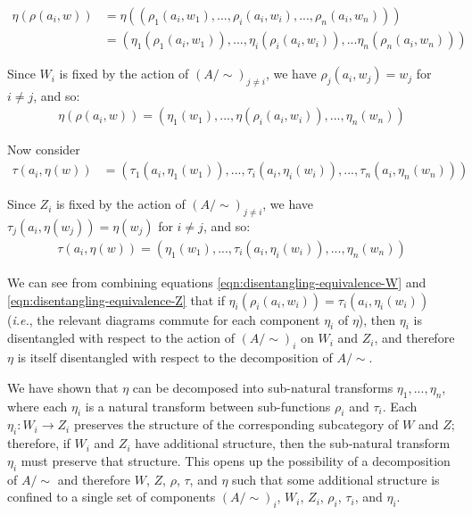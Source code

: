 \begin{align*}
    \eta(\rho(a_{i}, w)) &= \eta((\rho_{1}(a_{i}, w_{1}),..., \rho_{i}(a_{i}, w_{i}), ..., \rho_{n}(a_{i}, w_{n}))) \\
    &= (\eta_{1}(\rho_{1}(a_{i}, w_{1})), ..., \eta_{i}(\rho_{i}(a_{i}, w_{i})), ... \eta_{n}(\rho_{n}(a_{i}, w_{n})))
\end{align*}

Since $W_{i}$ is fixed by the action of $(A/\sim)_{j \neq i}$, we have $\rho_{j}(a_{i}, w_{j}) = w_{j}$ for $i \neq j$, and so:
\begin{align}
    \eta(\rho(a_{i}, w)) = (\eta_{1}(w_{1}), ..., \eta(\rho_{i}(a_{i}, w_{i})), ..., \eta_{n}(w_{n}))
    \label{eqn:disentangling-equivalence-W}
\end{align}

Now consider
\begin{align*}
    \tau(a_{i}, \eta(w)) &= (\tau_{1}(a_{i}, \eta_{1}(w_{1})),..., \tau_{i}(a_{i}, \eta_{i}(w_{i})), ..., \tau_{n}(a_{i}, \eta_{n}(w_{n})))
\end{align*}

Since $Z_{i}$ is fixed by the action of $(A/\sim)_{j \neq i}$, we have $\tau_{j}(a_{i}, \eta(w_{j})) = \eta(w_{j})$ for $i \neq j$, and so:
\begin{align}
    \tau(a_{i}, \eta(w)) = (\eta_{1}(w_{1}),..., \tau_{i}(a_{i}, \eta_{i}(w_{i})), ..., \eta_{n}(w_{n}))
    \label{eqn:disentangling-equivalence-Z}
\end{align}

We can see from combining equations \ref{eqn:disentangling-equivalence-W} and \ref{eqn:disentangling-equivalence-Z} that if $\eta_{i}(\rho_{i}(a_{i}, w_{i})) = \tau_{i}(a_{i}, \eta_{i}(w_{i}))$ (\textit{i.e.}, the relevant diagrams commute for each component $\eta_{i}$ of $\eta$), then $\eta_{i}$ is disentangled with respect to the action of $(A/\sim)_{i}$ on $W_{i}$ and $Z_{i}$, and therefore $\eta$ is itself disentangled with respect to the decomposition of $A/\sim$.

We have shown that $\eta$ can be decomposed into sub-natural transforms $\eta_{1}, ..., \eta_{n}$, where each $\eta_{i}$ is a natural transform between sub-functions $\rho_{i}$ and $\tau_{i}$.
Each $\eta_{i}: W_{i} \to Z_{i}$ preserves the structure of the corresponding subcategory of $W$ and $Z$; therefore, if $W_{i}$ and $Z_{i}$ have additional structure, then the sub-natural transform $\eta_{i}$ must preserve that structure.
This opens up the possibility of a decomposition of $A/\sim$ and therefore $W$, $Z$, $\rho$, $\tau$, and $\eta$ such that some additional structure is confined to a single set of components $(A/\sim)_{i}$, $W_{i}$, $Z_{i}$, $\rho_{i}$, $\tau_{i}$, and $\eta_{i}$.

